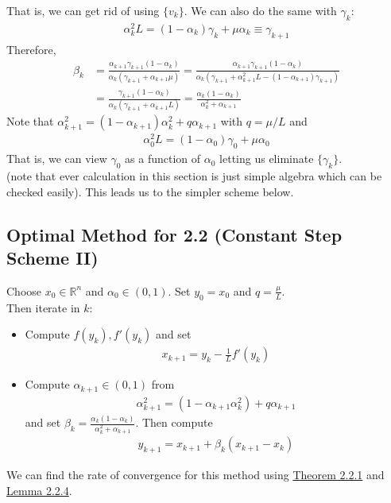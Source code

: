 \documentclass[12pt,a4paper]{article}
\begin{document}
	That is, we can get rid of using $\{v_k\}$. We can also do the same with $\gamma_k$:
	\begin{align*}
		\alpha_k^2L = (1 - \alpha_k)\gamma_k + \mu \alpha_k \equiv \gamma_{k+1}
	\end{align*}
	Therefore,
	\begin{align*}
		\beta_k &= \frac{\alpha_{k+1}\gamma_{k+1}(1 - \alpha_k)}{\alpha_k(\gamma_{k+1} + \alpha_{k+1}\mu)} = \frac{\alpha_{k+1}\gamma_{k+1}(1 - \alpha_k)}{\alpha_k(\gamma_{k+1} + \alpha_{k+1}^2L - (1 - \alpha_{k+1})\gamma_{k+1})} \\
		&= \frac{\gamma_{k+1}(1 - \alpha_k)}{\alpha_k(\gamma_{k+1} + \alpha_{k+1}L)} = \frac{\alpha_k(1 - \alpha_k)}{\alpha_k^2 + \alpha_{k+1}}
	\end{align*}
	Note that $\alpha_{k+1}^2 = (1 - \alpha_{k+1})\alpha_k^2 + q \alpha_{k+1}$ with $q = \mu / L$ and
	\begin{align*}
		\alpha_0^2L = (1 - \alpha_0)\gamma_0 + \mu \alpha_0
	\end{align*}
	That is, we can view $\gamma_0$ as a function of $\alpha_0$ letting us eliminate $\{\gamma_k\}$. \\
	(note that ever calculation in this section is just simple algebra which can be checked easily). This leads us to the simpler scheme below.
	
	\subsection*{Optimal Method for 2.2 (Constant Step Scheme II)}\label{sec22optvar2}
	Choose $x_0 \in \mathbb{R}^n$ and $\alpha_0 \in (0,1)$. Set $y_0 = x_0$ and $q = \frac{\mu}{L}$. \\
	Then iterate in $k$:
	\begin{itemize}
		\item Compute $f(y_k), f'(y_k)$ and set
		\begin{align*}
			x_{k+1} = y_k - \frac{1}{L}f'(y_k)
		\end{align*}
		\item Compute $\alpha_{k+1} \in (0,1)$ from 
		\begin{align*}
			\alpha_{k+1}^2 = (1 - \alpha_{k+1}\alpha_k^2) + q \alpha_{k+1}
		\end{align*}
		and set $\beta_k = \frac{\alpha_k(1 - \alpha_k)}{\alpha_k^2 + \alpha_{k+1}}$. Then compute
		\begin{align*}
			y_{k+1} = x_{k+1} + \beta_k(x_{k+1} - x_k)
		\end{align*}
	\end{itemize}
	We can find the rate of convergence for this method using \hyperref[thm221]{Theorem 2.2.1} and \hyperref[lem224]{Lemma 2.2.4}.
\end{document}
